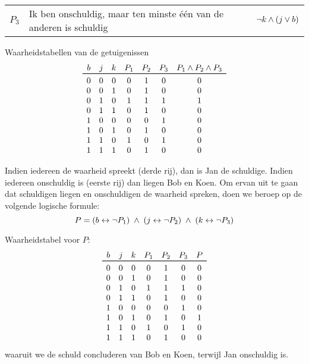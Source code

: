 \begin{oef}
\begin{opl}
\begin{samepage}
\begin{center}
\begin{tabular}{rp{8cm}l}
    $P_3$ & \raggedright Ik ben onschuldig, maar ten minste \'{e}\'{e}n van de anderen is schuldig & $\neg k \wedge (j \vee b)$ \\
  \end{tabular}
\end{center}
\end{samepage}
\begin{samepage}
Waarheidstabellen van de getuigenissen
\[
  \begin{array}{cccccccc}
    b & j & k & P_1 & P_2 & P_3 & P_1 \en P_2 \en P_3 \\
    \toprule
    0 & 0 & 0 & 0 & 1 & 0 & 0 \\
    0 & 0 & 1 & 0 & 1 & 0 & 0 \\
    0 & 1 & 0 & 1 & 1 & 1 & 1 \\
    0 & 1 & 1 & 0 & 1 & 0 & 0 \\
    1 & 0 & 0 & 0 & 0 & 1 & 0 \\
    1 & 0 & 1 & 0 & 1 & 0 & 0 \\
    1 & 1 & 0 & 1 & 0 & 1 & 0 \\
    1 & 1 & 1 & 0 & 1 & 0 & 0 \\
  \end{array}
\]
\end{samepage}
\begin{samepage}
Indien iedereen de waarheid spreekt (derde rij), dan is Jan de schuldige.
Indien iedereen onschuldig is (eerste rij) dan liegen Bob en Koen.
Om ervan uit te gaan dat schuldigen liegen en onschuldigen de waarheid spreken,
doen we beroep op de volgende logische formule:
\[
  P = (b \leftrightarrow \neg P_1) \;\wedge\; (j \leftrightarrow \neg P_2) \;\wedge\; (k \leftrightarrow \neg P_3)
\]
\end{samepage}
\begin{samepage}
Waarheidstabel voor $P$:
\[
  \begin{array}{cccccccc}
    b & j & k & P_1 & P_2 & P_3 & P \\
    \toprule
    0 & 0 & 0 & 0 & 1 & 0 & 0 \\
    0 & 0 & 1 & 0 & 1 & 0 & 0 \\
    0 & 1 & 0 & 1 & 1 & 1 & 0 \\
    0 & 1 & 1 & 0 & 1 & 0 & 0 \\
    1 & 0 & 0 & 0 & 0 & 1 & 0 \\
    1 & 0 & 1 & 0 & 1 & 0 & 1 \\
    1 & 1 & 0 & 1 & 0 & 1 & 0 \\
    1 & 1 & 1 & 0 & 1 & 0 & 0 \\
  \end{array}
\]
waaruit we de schuld concluderen van Bob en Koen, terwijl Jan onschuldig is.
\end{samepage}
\end{opl}
\end{oef}

